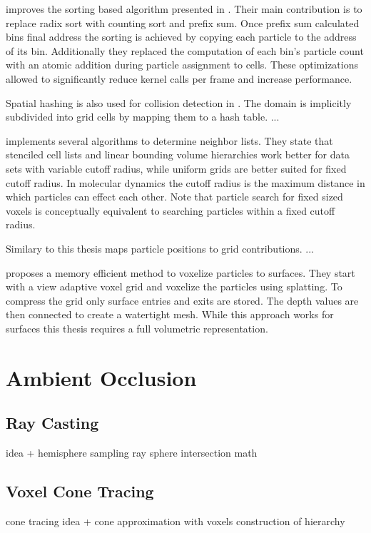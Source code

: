 \documentclass[hyperref,german,diplominf]{cgvpub}
\begin{document}
 \cite{13} improves the sorting based algorithm presented in  \cite{5}. Their main contribution is to replace radix sort with counting sort and prefix sum. Once prefix sum calculated bins final address the sorting is achieved by copying each particle to the address of its bin. Additionally they replaced the computation of each bin's particle count with an atomic addition during particle assignment to cells. These optimizations allowed to significantly reduce kernel calls per frame and increase performance.

Spatial hashing is also used for collision detection in  \cite{7}. The domain is implicitly subdivided into grid cells by mapping them to a hash table. ...

 \cite{12} implements several algorithms to determine neighbor lists. They state that stenciled cell lists and linear bounding volume hierarchies work better for data sets with variable cutoff radius, while uniform grids are better suited for fixed cutoff radius. In molecular dynamics the cutoff radius is the maximum distance in which particles can effect each other. Note that particle search for fixed sized voxels is conceptually equivalent to searching particles within a fixed cutoff radius.

Similary to this thesis  \cite{4} maps particle positions to grid contributions. ...

 \cite{8} proposes a memory efficient method to voxelize particles to surfaces. They start with a view adaptive voxel grid and voxelize the particles using splatting. To compress the grid only surface entries and exits are stored. The depth values are then connected to create a watertight mesh. While this approach works for surfaces this thesis requires a full volumetric representation.

\chapter{Ambient Occlusion}

\section{Ray Casting}
idea + hemisphere sampling
ray sphere intersection math

\section{Voxel Cone Tracing}
cone tracing idea + cone approximation with voxels
construction of hierarchy
\end{document}
